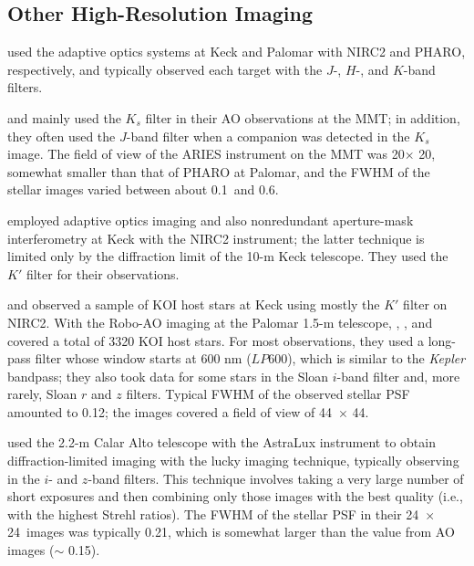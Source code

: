 \documentclass[twocolumn,appendixfloats]{aastex6}
\begin{document}
\subsection{Other High-Resolution Imaging}
\label{other_highres}

\citet{wang15a,wang15b} used the adaptive optics systems at Keck and Palomar 
with NIRC2 and PHARO, respectively, and typically observed each target with 
the $J$-, $H$-, and $K$-band filters.

\citet{adams12,adams13} and \citet{dressing14} mainly used the $K_s$ filter 
in their AO observations at the MMT; in addition, they often used the $J$-band 
filter when a companion was detected in the $K_s$ image. The field of view of 
the ARIES instrument on the MMT was 20\arcsec $\times$ 20\arcsec, somewhat 
smaller than that of PHARO at Palomar, and the FWHM of the stellar images 
varied between about 0.1\arcsec\ and 0.6\arcsec.

\citet{kraus16} employed adaptive optics imaging and also nonredundant 
aperture-mask interferometry at Keck with the NIRC2 instrument; the latter 
technique is limited only by the diffraction limit of the 10-m Keck telescope. 
They used the $K'$ filter for their observations.

\citet{baranec16} and \citet{ziegler16} observed a sample of KOI host stars at 
Keck using mostly the $K'$ filter on NIRC2.
With the Robo-AO imaging at the Palomar 1.5-m telescope, \citet{law14},
\citet{baranec16}, and \citet{ziegler16} covered a total of 3320 KOI host stars. 
For most observations, they used a long-pass filter whose window starts at 
600 nm ($LP600$), which is similar to the {\it Kepler} bandpass; they also took 
data for some stars in the Sloan $i$-band filter and, more rarely, Sloan $r$ 
and $z$ filters. Typical FWHM of the observed stellar PSF amounted to 
0.12\arcsec; the images covered a field of view of 44\arcsec\
$\times$ 44\arcsec.

\citet {lillo-box12, lillo-box14} used the 2.2-m Calar Alto telescope with
the AstraLux instrument to obtain diffraction-limited imaging with the
lucky imaging technique, typically observing in the $i$- and $z$-band filters. 
This technique involves taking a very large number of short exposures and 
then combining only those images with the best quality (i.e., with the highest 
Strehl ratios). The FWHM of the stellar PSF in their 24\arcsec\ $\times$
24\arcsec\ images was typically 0.21\arcsec, which is somewhat larger than 
the value from AO images ($\sim$ 0.15\arcsec).
\end{document}
